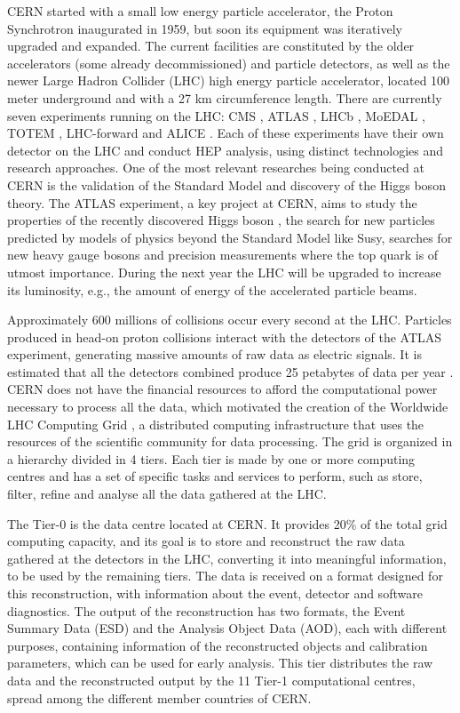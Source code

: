 CERN started with a small low energy particle accelerator, the Proton Synchrotron \cite{CERN:PS} inaugurated in 1959, but soon its equipment was iteratively upgraded and expanded. The current facilities are constituted by the older accelerators (some already decommissioned) and particle detectors, as well as the newer Large Hadron Collider (LHC) \cite{CERN:LHC} high energy particle accelerator, located 100 meter underground and with a 27 km circumference length. There are currently seven experiments running on the LHC: CMS \cite{CERN:CMS}, ATLAS \cite{CERN:ATLAS}, LHCb \cite{CERN:LHCb}, MoEDAL \cite{CERN:MoEDAL}, TOTEM \cite{CERN:TOTEM}, LHC-forward \cite{CERN:LHCf} and ALICE \cite{CERN:ALICE}. Each of these experiments have their own detector on the LHC and conduct HEP analysis, using distinct technologies and research approaches. One of the most relevant researches being conducted at CERN is the validation of the Standard Model and discovery of the Higgs boson theory. The ATLAS experiment, a key project at CERN, aims to study the properties of the recently discovered Higgs boson \cite{Higgs}, the search for new particles predicted by models of physics beyond the Standard Model like Susy, searches for new heavy gauge bosons and precision measurements where the top quark is of utmost importance. During the next year the LHC will be upgraded to increase its luminosity, e.g., the amount of energy of the accelerated particle beams.

Approximately 600 millions of collisions occur every second at the LHC. Particles produced in head-on proton collisions interact with the detectors of the ATLAS experiment, generating massive amounts of raw data as electric signals. It is estimated that all the detectors combined produce 25 petabytes of data per year \cite{CERN:DATA1,CERN:DATA2}. CERN does not have the financial resources to afford the computational power necessary to process all the data, which motivated the creation of the Worldwide LHC Computing Grid \cite{CERN:WLHCCG}, a distributed computing infrastructure that uses the resources of the scientific community for data processing. The grid is organized in a hierarchy divided in 4 tiers. Each tier is made by one or more computing centres and has a set of specific tasks and services to perform, such as store, filter, refine and analyse all the data gathered at the LHC.

The Tier-0 is the data centre located at CERN. It provides 20\% of the total grid computing capacity, and its goal is to store and reconstruct the raw data gathered at the detectors in the LHC, converting it into meaningful information, to be used by the remaining tiers. The data is received on a format designed for this reconstruction, with information about the event, detector and software diagnostics. The output of the reconstruction has two formats, the Event Summary Data (ESD) and the Analysis Object Data (AOD), each with different purposes, containing information of the reconstructed objects and calibration parameters, which can be used for early analysis. This tier distributes the raw data and the reconstructed output by the 11 Tier-1 computational centres, spread among the different member countries of CERN.

